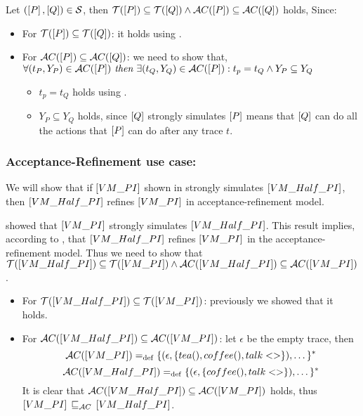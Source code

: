 \begin{prf}
Let $(\left[P\right],\left[Q\right])\in{}\mathcal{S}$, then $\traces[P]\subseteq\traces[Q] \wedge \accepatances[P]\subseteq\accepatances[Q]$ holds, Since:
\begin{itemize}
\item For $\traces[P]\subseteq\traces[Q]$: it holds using .
\item For $\accepatances[P]\subseteq\accepatances[Q]$: we need to show that,\\$\forall (t_P, Y_P) \in \accepatances[P] \textit{ then } \exists (t_Q, Y_Q) \in \accepatances[P]: t_p = t_Q \wedge Y_P \subseteq Y_Q$
\begin{itemize}
\item $t_p = t_Q$ holds using .
\item $Y_P \subseteq Y_Q$ holds, since $\left[Q\right]$ strongly simulates $\left[P\right]$ means that $\left[Q\right]$ can do all the actions that $\left[P\right]$ can do after any trace $t$.
\end{itemize}
\end{itemize}
\end{prf}
\subsubsection{Acceptance-Refinement use case:}
 We will show that if $\left[VM\_PI\right]$ shown in  strongly simulates $\left[VM\_Half\_PI\right]$, then $\left[VM\_Half\_PI\right]$ refines $\left[VM\_PI\right]$ in acceptance-refinement model.
 
  showed that $\left[VM\_PI\right]$ strongly simulates $\left[VM\_Half\_PI\right]$. This result implies, according to , that $\left[VM\_Half\_PI\right]$ refines $\left[VM\_PI\right]$ in the acceptance-refinement model. Thus we need to show that $\traces[VM\_Half\_PI]\subseteq\traces[VM\_PI] \wedge \accepatances[VM\_Half\_PI]\subseteq\accepatances[VM\_PI]$.
 
 \begin{itemize}
\item For $\traces[VM\_Half\_PI]\subseteq\traces[VM\_PI]$: previously we showed that it holds. 

\item For $\accepatances[VM\_Half\_PI]\subseteq\accepatances[VM\_PI]$: let $\epsilon$ be the empty trace, then
    \[\accepatances[VM\_PI] \define \{(\epsilon,\{tea(),coffee(),talk<>\}),\dots\}^\ast\]
    \[\accepatances[VM\_Half\_PI] \define \{(\epsilon,\{coffee(),talk<>\}),\dots\}^\ast\]
It is clear that $\accepatances[VM\_Half\_PI]\subseteq\accepatances[VM\_PI]$ holds, thus $\ec{VM\_PI} \refiAC \ec{VM\_Half\_PI}$.
\end{itemize}